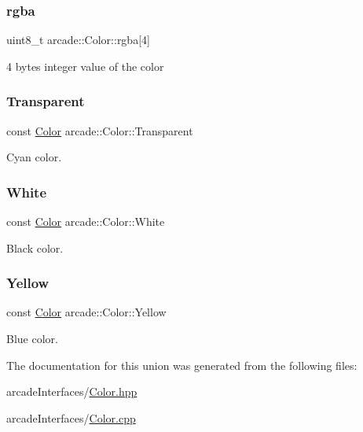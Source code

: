 \mbox{\label{unionarcade_1_1_color_a805bb231543d607ee00f353506c850be}} 
\subsubsection{\texorpdfstring{rgba}{rgba}}
{\footnotesize\ttfamily uint8\+\_\+t arcade\+::\+Color\+::rgba\mbox{[}4\mbox{]}}



4 bytes integer value of the color 

\mbox{\label{unionarcade_1_1_color_a689350442a28301beb49ca78a4885e4f}} 
\subsubsection{\texorpdfstring{Transparent}{Transparent}}
{\footnotesize\ttfamily const \hyperlink{unionarcade_1_1_color}{Color} arcade\+::\+Color\+::\+Transparent\hspace{0.3cm}{\ttfamily [static]}}



Cyan color. 

\mbox{\label{unionarcade_1_1_color_aa8bd809fbf902dbbe53b9bb6802eb57f}} 
\subsubsection{\texorpdfstring{White}{White}}
{\footnotesize\ttfamily const \hyperlink{unionarcade_1_1_color}{Color} arcade\+::\+Color\+::\+White\hspace{0.3cm}{\ttfamily [static]}}



Black color. 

\mbox{\label{unionarcade_1_1_color_aa437de4029652dba87b0b64ca488f8ff}} 
\subsubsection{\texorpdfstring{Yellow}{Yellow}}
{\footnotesize\ttfamily const \hyperlink{unionarcade_1_1_color}{Color} arcade\+::\+Color\+::\+Yellow\hspace{0.3cm}{\ttfamily [static]}}



Blue color. 



The documentation for this union was generated from the following files\+:\begin{DoxyCompactItemize}
\item 
arcade\+Interfaces/\hyperlink{_color_8hpp}{Color.\+hpp}\item 
arcade\+Interfaces/\hyperlink{_color_8cpp}{Color.\+cpp}\end{DoxyCompactItemize}
